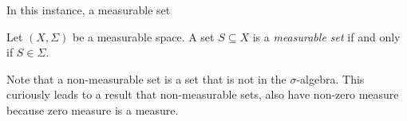In this instance, a measurable set 
\begin{definition}
    Let $(X,\Sigma)$ be a measurable space.  A set $S\subseteq X$ is a \textit{measurable set} if and only if $S \in \Sigma$.
\end{definition}
Note that a non-measurable set is a set that is not in the $\sigma$-algebra.  This curiously leads to a result that non-measurable sets, also have non-zero measure because zero measure is a measure.  


        
    

  

